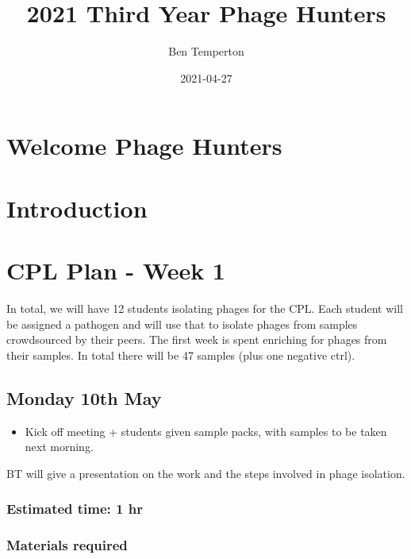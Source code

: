 \documentclass[
]{book}
\title{2021 Third Year Phage Hunters}
\author{Ben Temperton}
\date{2021-04-27}
\providecommand{\tightlist}{%
  \setlength{\itemsep}{0pt}\setlength{\parskip}{0pt}}
\begin{document}
\maketitle

{
\setcounter{tocdepth}{1}
\tableofcontents
}
\hypertarget{welcome-phage-hunters}{%
\chapter{Welcome Phage Hunters}\label{welcome-phage-hunters}}

\hypertarget{intro}{%
\chapter{Introduction}\label{intro}}

\hypertarget{cpl-plan---week-1}{%
\chapter{CPL Plan - Week 1}\label{cpl-plan---week-1}}

In total, we will have 12 students isolating phages for the CPL. Each student will be assigned a pathogen and will use that to isolate phages from samples crowdsourced by their peers. The first week is spent enriching for phages from their samples. In total there will be 47 samples (plus one negative ctrl).

\hypertarget{monday-10th-may}{%
\section{Monday 10th May}\label{monday-10th-may}}

\begin{itemize}
\tightlist
\item
  Kick off meeting + students given sample packs, with samples to be taken next morning.
\end{itemize}

BT will give a presentation on the work and the steps involved in phage isolation.

\hypertarget{estimated-time-1-hr}{%
\subsection{Estimated time: 1 hr}\label{estimated-time-1-hr}}

\hypertarget{materials-required}{%
\subsection{Materials required}\label{materials-required}}
\end{document}
